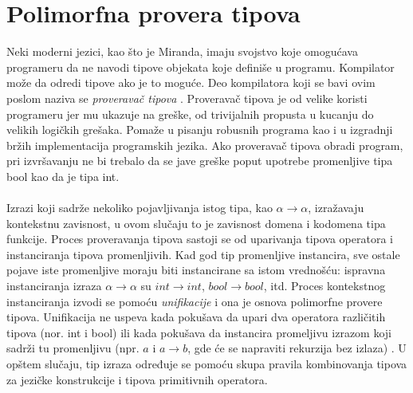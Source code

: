 
\section{Polimorfna provera tipova}
\label{sec:provera tipova}


Neki moderni jezici, kao što je Miranda, imaju svojstvo koje omogućava programeru da ne navodi tipove objekata koje definiše u programu. Kompilator može da odredi tipove ako je to moguće. Deo kompilatora koji se bavi ovim poslom naziva se \textit{proveravač tipova} \cite{the-implementation-of-functional-programming-languages}. Proveravač tipova je od velike koristi programeru jer mu ukazuje na greške, od trivijalnih propusta u kucanju do velikih logičkih grešaka. Pomaže u pisanju robusnih programa kao i u izgradnji bržih implementacija programskih jezika. Ako proveravač tipova obradi program, pri izvršavanju ne bi trebalo da se jave greške poput upotrebe promenljive tipa bool kao da je tipa int.
\\
\\ %

Izrazi koji sadrže nekoliko pojavljivanja istog tipa, kao $\alpha \longrightarrow \alpha$, izražavaju kontekstnu zavisnost, u ovom slučaju to je zavisnost domena i kodomena tipa funkcije. Proces proveravanja tipova sastoji se od uparivanja tipova operatora i instanciranja tipova promenljivih. Kad god tip promenljive instancira, sve ostale pojave iste promenljive moraju biti instancirane sa istom vrednošću: ispravna instanciranja izraza $\alpha \longrightarrow \alpha$ su $int \longrightarrow int$,  $bool \longrightarrow bool$, itd. Proces kontekstnog instanciranja izvodi se pomoću \textit{unifikacije} i ona je osnova polimorfne provere tipova. Unifikacija ne uspeva kada pokušava da upari dva operatora različitih tipova (nor. int i bool) ili kada pokušava da instancira promeljivu izrazom koji sadrži tu promenljivu (npr. $a$ i $a\longrightarrow b$, gde će se napraviti rekurzija bez izlaza) \cite{basic-typechecking}. %
U opštem slučaju, tip izraza određuje se pomoću skupa pravila kombinovanja tipova za jezičke konstrukcije i tipova primitivnih operatora. 

